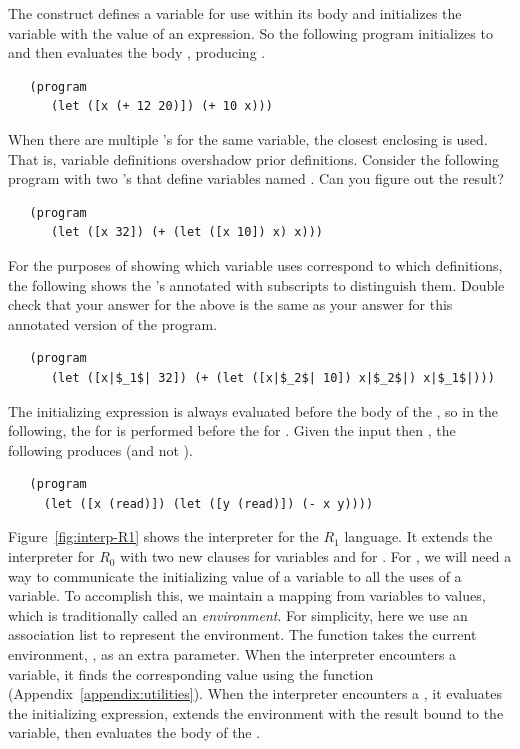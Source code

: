 \documentclass[11pt]{book}
\begin{document}
The  construct defines a variable for use within its body
and initializes the variable with the value of an expression.  So the
following program initializes  to  and then evaluates
the body , producing .
\begin{lstlisting}
   (program
      (let ([x (+ 12 20)]) (+ 10 x)))
\end{lstlisting}
When there are multiple 's for the same variable, the closest
enclosing  is used. That is, variable definitions overshadow
prior definitions. Consider the following program with two 's
that define variables named . Can you figure out the result?
\begin{lstlisting}
   (program
      (let ([x 32]) (+ (let ([x 10]) x) x)))
\end{lstlisting}
For the purposes of showing which variable uses correspond to which
definitions, the following shows the 's annotated with subscripts
to distinguish them. Double check that your answer for the above is
the same as your answer for this annotated version of the program.
\begin{lstlisting}
   (program
      (let ([x|$_1$| 32]) (+ (let ([x|$_2$| 10]) x|$_2$|) x|$_1$|)))
\end{lstlisting}
The initializing expression is always evaluated before the body of the
, so in the following, the  for  is
performed before the  for . Given the input
 then , the following produces  (and not
).
\begin{lstlisting}
   (program
     (let ([x (read)]) (let ([y (read)]) (- x y))))
\end{lstlisting}

Figure~\ref{fig:interp-R1} shows the interpreter for the $R_1$
language. It extends the interpreter for $R_0$ with two new
 clauses for variables and for .  For ,
we will need a way to communicate the initializing value of a variable
to all the uses of a variable. To accomplish this, we maintain a
mapping from variables to values, which is traditionally called an
\emph{environment}. For simplicity, here we use an association list to
represent the environment. The  function takes the
current environment, , as an extra parameter.  When the
interpreter encounters a variable, it finds the corresponding value
using the  function (Appendix~\ref{appendix:utilities}).
When the interpreter encounters a , it evaluates the
initializing expression, extends the environment with the result bound
to the variable, then evaluates the body of the .
\end{document}
